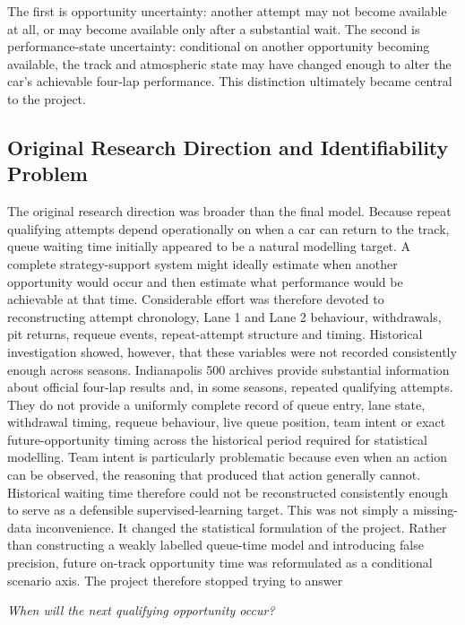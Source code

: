 The first is opportunity uncertainty: another attempt may not become available at all, or may become available only after a substantial wait. The second is performance-state uncertainty: conditional on another opportunity becoming available, the track and atmospheric state may have changed enough to alter the car's achievable four-lap performance. This distinction ultimately became central to the project.

\subsection{Original Research Direction and Identifiability Problem}
The original research direction was broader than the final model. Because repeat qualifying attempts depend operationally on when a car can return to the track, queue waiting time initially appeared to be a natural modelling target. A complete strategy-support system might ideally estimate when another opportunity would occur and then estimate what performance would be achievable at that time. Considerable effort was therefore devoted to reconstructing attempt chronology, Lane 1 and Lane 2 behaviour, withdrawals, pit returns, requeue events, repeat-attempt structure and timing. Historical investigation showed, however, that these variables were not recorded consistently enough across seasons. Indianapolis 500 archives provide substantial information about official four-lap results and, in some seasons, repeated qualifying attempts. They do not provide a uniformly complete record of queue entry, lane state, withdrawal timing, requeue behaviour, live queue position, team intent or exact future-opportunity timing across the historical period required for statistical modelling. Team intent is particularly problematic because even when an action can be observed, the reasoning that produced that action generally cannot. Historical waiting time therefore could not be reconstructed consistently enough to serve as a defensible supervised-learning target. This was not simply a missing-data inconvenience. It changed the statistical formulation of the project. Rather than constructing a weakly labelled queue-time model and introducing false precision, future on-track opportunity time was reformulated as a conditional scenario axis. The project therefore stopped trying to answer

\begin{center}\textit{When will the next qualifying opportunity occur?}\end{center}

